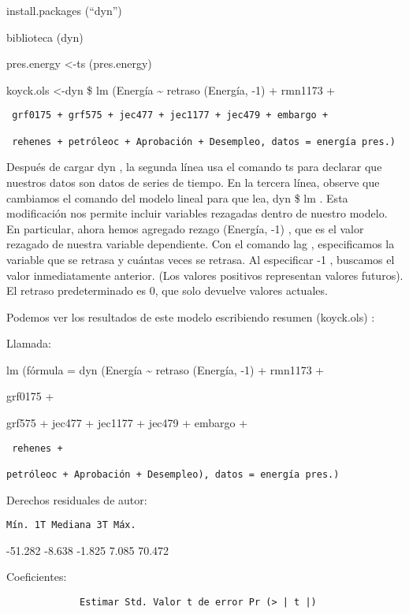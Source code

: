 \documentclass[
]{book}
\begin{document}
install.packages (``dyn'')

biblioteca (dyn)

pres.energy \textless-ts (pres.energy)

koyck.ols \textless-dyn \$ lm (Energía \textasciitilde{} retraso (Energía, -1) + rmn1173 +

\begin{verbatim}
 grf0175 + grf575 + jec477 + jec1177 + jec479 + embargo +

 rehenes + petróleoc + Aprobación + Desempleo, datos = energía pres.)
\end{verbatim}

Después de cargar dyn , la segunda línea usa el comando ts para declarar que nuestros datos son datos de series de tiempo. En la tercera línea, observe que cambiamos el comando del modelo lineal para que lea, dyn \$ lm . Esta modificación nos permite incluir variables rezagadas dentro de nuestro modelo. En particular, ahora hemos agregado rezago (Energía, -1) , que es el valor rezagado de nuestra variable dependiente. Con el comando lag , especificamos la variable que se retrasa y cuántas veces se retrasa. Al especificar -1 , buscamos el valor inmediatamente anterior. (Los valores positivos representan valores futuros). El retraso predeterminado es 0, que solo devuelve valores actuales.

Podemos ver los resultados de este modelo escribiendo resumen (koyck.ols) :

Llamada:

lm (fórmula = dyn (Energía \textasciitilde{} retraso (Energía, -1) + rmn1173 +

grf0175 +

grf575 + jec477 + jec1177 + jec479 + embargo +

\begin{verbatim}
 rehenes +

petróleoc + Aprobación + Desempleo), datos = energía pres.)
\end{verbatim}

Derechos residuales de autor:

\begin{verbatim}
Mín. 1T Mediana 3T Máx.
\end{verbatim}

-51.282 -8.638 -1.825 7.085 70.472

Coeficientes:

\begin{verbatim}
             Estimar Std. Valor t de error Pr (> | t |)
\end{verbatim}
\end{document}
